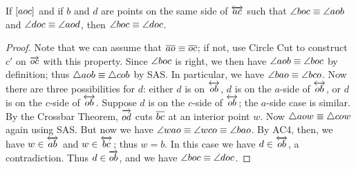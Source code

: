 \begin{lem}\label{lem:coinitial-right-angle-congruence}
If \([ a o c ]\) and if \(b\) and \(d\) are points on the same side of \(\overleftrightarrow{ac}\) such that \(\angle{boc} \equiv \angle{aob}\) and \(\angle{doc} \equiv \angle{aod}\), then \(\angle{boc} \equiv \angle{doc}\).
\end{lem}

\begin{proof}
Note that we can assume that \(\overline{ao} \equiv \overline{oc}\); if not, use Circle Cut to construct \(c'\) on \(\overrightarrow{oc}\) with this property.
Since \(\angle{boc}\) is right, we then have \(\angle{aob} \equiv \angle{boc}\) by definition; thus \(\bigtriangleup{aob} \equiv \bigtriangleup{cob}\) by SAS.
In particular, we have \(\angle{bao} \equiv \angle{bco}\).
Now there are three possibilities for \(d\): either \(d\) is on \(\overleftrightarrow{ob}\), \(d\) is on the \(a\)-side of \(\overleftrightarrow{ob}\), or \(d\) is on the \(c\)-side of \(\overleftrightarrow{ob}\).
Suppose \(d\) is on the \(c\)-side of \(\overleftrightarrow{ob}\); the \(a\)-side case is similar.
By the Crossbar Theorem, \(\overrightarrow{od}\) cuts \(\overline{bc}\) at an interior point \(w\).
Now \(\bigtriangleup{aow} \equiv \bigtriangleup{cow}\) again using SAS.
But now we have \(\angle{wao} \equiv \angle{wco} \equiv \angle{bao}\).
By AC4, then, we have \(w \in \overleftrightarrow{ab}\) and \(w \in \overleftrightarrow{bc}\); thus \(w = b\).
In this case we have \(d \in \overleftrightarrow{ob}\), a contradiction.
Thus \(d \in \overrightarrow{ob}\), and we have \(\angle{boc} \equiv \angle{doc}\).
\end{proof}


